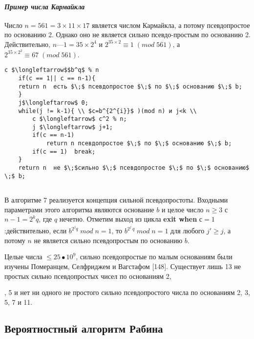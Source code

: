 \documentclass{mai_book}
\begin{document}
  	\paragraph{{\it Пример числа Кармайкла}}
  	\noindent
  	
  	Число $n = 561 = 3 \times 11 \times 17$ является числом Кармайкла, а потому 	псевдопростое по основанию 2. Однако оно не является сильно псевдо-простым по основанию 2. Действительно, $n — 1 = 35 \times 2^4$
  	и $2^{35\times 2} \equiv1\;(mod\;561)$, а $2^{35\times 2^2} \equiv 67\;(mod\;561)$.
  	
  	\begin{lstlisting}[mathescape=true, caption=Сильная псевдопростота по основанию $b$]
  	c $\longleftarrow$$b^q$ % n
  	if(c == 1|| c == n-1){
  	return n  есть $\;$ псевдопростое $\;$ по $\;$ основанию $\;$ b;
  	} 
  	j$\longleftarrow$ 0;
  	while(j != k-1){ \\ $c=b^{2^{i}}$ )(mod n) и j<k \\
  		c $\longleftarrow$ c^2 % n;
  		j $\longleftarrow$ j+1;
  		if(c == n-1)
  			return n псевдопростое $\;$ по $\;$ основанию $\;$ b;
  		if(c == 1)	break;
  	}	
  	return n  не $\;$сильно $\;$ псевдопростое $\;$ по $\;$ основанию$ \;$ b;
  	 
  	\end{lstlisting}
  	В алгоритме 7 реализуется концепция сильной псевдопростоты.	Входными параметрами этого алгоритма являются основание $b$ и це­лое число $n \geqslant 3$ с $n - 1 = 2^kq$, где $q$ нечетно. Отметим выход из цикла	{\bf exit when} $с = 1$:действительно, если $b^{2^{j}q} \;mod\;n = 1$, то $b^{2^{j^{'}}q}\;mod\;n = 1$	для любого $j' \geqslant j$, а потому $n$ не является сильно псевдопростым по основанию $b$. 
  	
  	Целые числа  $\leqslant 25 • 10^9$, сильно псевдопростые по малым основаниям 	были изучены Померанцем, Селфриджем и Вагстафом [148]. Существует лишь 13 не простых сильно псевдопростых чисел по основаниям 2,
  	
  	\pagebreak
  	
  	
  	, 5 и нет ни одного не простого сильно псевдопростого числа по основаниям 2, 3, 5, 7 и 11.
  	
  	\subsection{Вероятностный алгоритм Рабина}
  	
\end{document}
